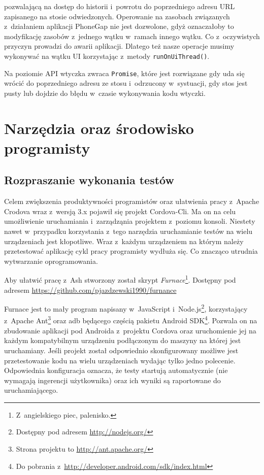 \documentclass[brudnopis]{xmgr}
\begin{document}
pozwalającą na dostęp do historii i~powrotu do poprzedniego  adresu URL zapisanego na stosie odwiedzonych. Operowanie na zasobach związanych z~działaniem aplikacji PhoneGap nie jest dozwolone, gdyż oznaczałoby to modyfikację zasobów z~jednego wątku w~ramach innego wątku. Co z~oczywistych przyczyn prowadzi do awarii aplikacji. Dlatego też nasze operacje musimy wykonywać na wątku UI korzystając z~metody \texttt{runOnUiThread()}.

Na poziomie API wtyczka zwraca \texttt{Promise}, które jest rozwiązane gdy uda się wrócić do poprzedniego adresu ze stosu i~odrzucony w~systuacji, gdy stos jest pusty lub dojdzie do błędu w~czasie wykonywania kodu wtyczki.

\chapter{Narzędzia oraz środowisko programisty}

\section{Rozpraszanie wykonania testów}

Celem zwiększenia produktywności programistów oraz ułatwienia pracy z~Apache Crodova wraz z~wersją 3.x pojawił się projekt Cordova-Cli. Ma on na celu umożliwienie uruchamiania i~zarządząnia projektem z~poziomu konsoli. Niestety nawet w~przypadku korzystania z~tego narzędzia uruchamianie testów na wielu urządzeniach jest kłopotliwe. Wraz z~każdym urządzeniem na którym należy przetestować aplikację cykl pracy programisty wydłuża się. Co znacząco utrudnia wytwarzanie oprogramowania.

Aby ułatwić pracę z~Ash stworzony został skrypt \textit{Furnace}\footnote{Z~angielskiego piec, palenisko.}. Dostępny pod adresem \url{https://github.com/pjazdzewski1990/furnance}

Furnace jest to mały program napisany w~JavaScript i~Node.js\footnote{Dostępny pod adresem \url{http://nodejs.org/} }, korzystający z~Apache Ant\footnote{Strona projektu to  \url{http://ant.apache.org/} } oraz adb będącego częścią pakietu Android SDK\footnote{Do pobrania z~\url{http://developer.android.com/sdk/index.html} }. Pozwala on na zbudowanie aplikacji pod Androida z~projektu Cordova oraz uruchomienie jej na każdym kompatybilnym urządzeniu podłączonym do maszyny na której jest uruchamiany. Jeśli projekt został odpowiednio skonfigurowany możliwe jest przetestowanie kodu na wielu urządzeniach wydając tylko jedno polecenie. Odpowiednia konfiguracja oznacza, że testy startują automatycznie (nie wymagają ingerencji użytkownika) oraz ich wyniki są raportowane do uruchamiającego. 
\end{document}
